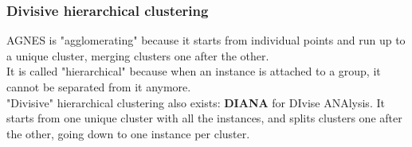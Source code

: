 \begin{frame}
\frametitle{Divisive hierarchical clustering}
AGNES is "agglomerating" because it starts from individual points and run up to a unique cluster, merging clusters one after the other. \\
\vspace{0.3cm}
It is called "hierarchical" because when an instance is attached to a group, it cannot be separated from it anymore.\\
\vspace{0.3cm} 
"Divisive" hierarchical clustering also exists: {\bf DIANA} for DIvise ANAlysis. It starts from one unique cluster with all the instances, and splits clusters one after the other, going down to one instance per cluster. 
\end{frame}
